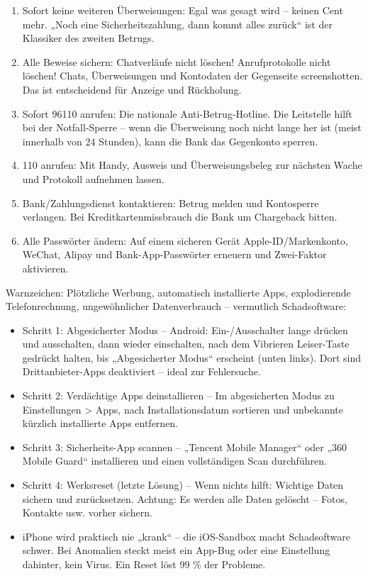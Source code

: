 \begin{enumerate}
  \item Sofort keine weiteren Überweisungen: Egal was gesagt wird – keinen Cent mehr. „Noch eine Sicherheitszahlung, dann kommt alles zurück“ ist der Klassiker des zweiten Betrugs.
  \item Alle Beweise sichern: Chatverläufe nicht löschen! Anrufprotokolle nicht löschen! Chats, Überweisungen und Kontodaten der Gegenseite screenshotten. Das ist entscheidend für Anzeige und Rückholung.
  \item Sofort 96110 anrufen: Die nationale Anti-Betrug-Hotline. Die Leitstelle hilft bei der Notfall-Sperre – wenn die Überweisung noch nicht lange her ist (meist innerhalb von 24 Stunden), kann die Bank das Gegenkonto sperren.
  \item 110 anrufen: Mit Handy, Ausweis und Überweisungsbeleg zur nächsten Wache und Protokoll aufnehmen lassen.
  \item Bank/Zahlungsdienst kontaktieren: Betrug melden und Kontosperre verlangen. Bei Kreditkartenmissbrauch die Bank um Chargeback bitten.
  \item Alle Passwörter ändern: Auf einem sicheren Gerät Apple-ID/Markenkonto, WeChat, Alipay und Bank-App-Passwörter erneuern und Zwei-Faktor aktivieren.
\end{enumerate}


Warnzeichen: Plötzliche Werbung, automatisch installierte Apps, explodierende Telefonrechnung, ungewöhnlicher Datenverbrauch – vermutlich Schadsoftware:

\begin{itemize}
  \item Schritt 1: Abgesicherter Modus – Android: Ein-/Ausschalter lange drücken und ausschalten, dann wieder einschalten, nach dem Vibrieren Leiser-Taste gedrückt halten, bis „Abgesicherter Modus“ erscheint (unten links). Dort sind Drittanbieter-Apps deaktiviert – ideal zur Fehlersuche.
  \item Schritt 2: Verdächtige Apps deinstallieren – Im abgesicherten Modus zu Einstellungen > Apps, nach Installationsdatum sortieren und unbekannte kürzlich installierte Apps entfernen.
  \item Schritt 3: Sicherheits-App scannen – „Tencent Mobile Manager“ oder „360 Mobile Guard“ installieren und einen vollständigen Scan durchführen.
  \item Schritt 4: Werksreset (letzte Lösung) – Wenn nichts hilft: Wichtige Daten sichern und zurücksetzen. Achtung: Es werden alle Daten gelöscht – Fotos, Kontakte usw. vorher sichern.
  \item iPhone wird praktisch nie „krank“ – die iOS-Sandbox macht Schadsoftware schwer. Bei Anomalien steckt meist ein App-Bug oder eine Einstellung dahinter, kein Virus. Ein Reset löst 99 \% der Probleme.
\end{itemize}


